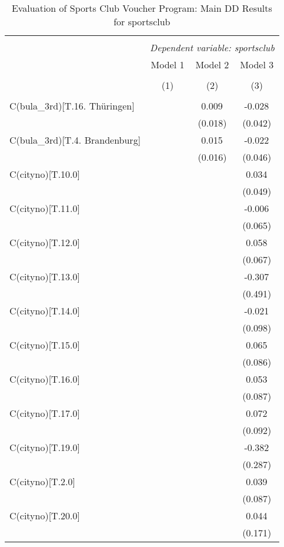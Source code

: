 \begin{table}[!htbp] \centering
  \caption{Evaluation of Sports Club Voucher Program: Main DD Results for sportsclub}
\begin{tabular}{@{\extracolsep{5pt}}lccc}
\\[-1.8ex]\hline
\hline \\[-1.8ex]
& \multicolumn{3}{c}{\textit{Dependent variable: sportsclub}} \
\cr \cline{2-4}
\\[-1.8ex] & \multicolumn{1}{c}{Model 1} & \multicolumn{1}{c}{Model 2} & \multicolumn{1}{c}{Model 3}  \\
\\[-1.8ex] & (1) & (2) & (3) \\
\hline \\[-1.8ex]
 C(bula_3rd)[T.16. Thüringen] & & 0.009$^{}$ & -0.028$^{}$ \\
& & (0.018) & (0.042) \\
 C(bula_3rd)[T.4. Brandenburg] & & 0.015$^{}$ & -0.022$^{}$ \\
& & (0.016) & (0.046) \\
 C(cityno)[T.10.0] & & & 0.034$^{}$ \\
& & & (0.049) \\
 C(cityno)[T.11.0] & & & -0.006$^{}$ \\
& & & (0.065) \\
 C(cityno)[T.12.0] & & & 0.058$^{}$ \\
& & & (0.067) \\
 C(cityno)[T.13.0] & & & -0.307$^{}$ \\
& & & (0.491) \\
 C(cityno)[T.14.0] & & & -0.021$^{}$ \\
& & & (0.098) \\
 C(cityno)[T.15.0] & & & 0.065$^{}$ \\
& & & (0.086) \\
 C(cityno)[T.16.0] & & & 0.053$^{}$ \\
& & & (0.087) \\
 C(cityno)[T.17.0] & & & 0.072$^{}$ \\
& & & (0.092) \\
 C(cityno)[T.19.0] & & & -0.382$^{}$ \\
& & & (0.287) \\
 C(cityno)[T.2.0] & & & 0.039$^{}$ \\
& & & (0.087) \\
 C(cityno)[T.20.0] & & & 0.044$^{}$ \\
& & & (0.171) \\

\end{tabular}
\end{table}
